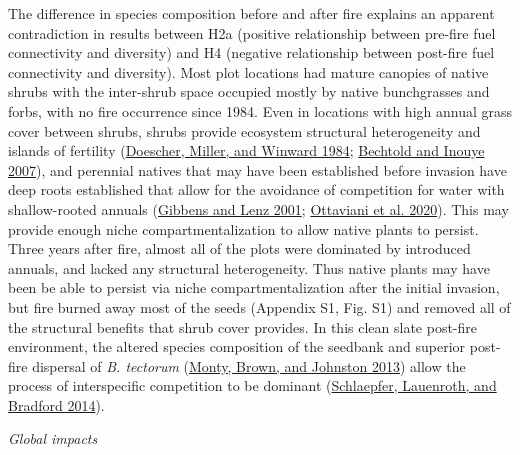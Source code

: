 \documentclass[
  12pt,
]{article}
\begin{document}
The difference in species composition before and after fire explains an
apparent contradiction in results between H2a (positive relationship
between pre-fire fuel connectivity and diversity) and H4 (negative
relationship between post-fire fuel connectivity and diversity). Most
plot locations had mature canopies of native shrubs with the inter-shrub
space occupied mostly by native bunchgrasses and forbs, with no fire
occurrence since 1984. Even in locations with high annual grass cover
between shrubs, shrubs provide ecosystem structural heterogeneity and
islands of fertility (\protect\hyperlink{ref-Doescher1984}{Doescher,
Miller, and Winward 1984}; \protect\hyperlink{ref-Bechtold2007}{Bechtold
and Inouye 2007}), and perennial natives that may have been established
before invasion have deep roots established that allow for the avoidance
of competition for water with shallow-rooted annuals
(\protect\hyperlink{ref-Gibbens2001}{Gibbens and Lenz 2001};
\protect\hyperlink{ref-Ottaviani2020}{Ottaviani et al. 2020}). This may
provide enough niche compartmentalization to allow native plants to
persist. Three years after fire, almost all of the plots were dominated
by introduced annuals, and lacked any structural heterogeneity. Thus
native plants may have been be able to persist via niche
compartmentalization after the initial invasion, but fire burned away
most of the seeds (Appendix S1, Fig. S1) and removed all of the
structural benefits that shrub cover provides. In this clean slate
post-fire environment, the altered species composition of the seedbank
and superior post-fire dispersal of \emph{B. tectorum}
(\protect\hyperlink{ref-Monty2013}{Monty, Brown, and Johnston 2013})
allow the process of interspecific competition to be dominant
(\protect\hyperlink{ref-Schlaepfer2014}{Schlaepfer, Lauenroth, and
Bradford 2014}).

\emph{Global impacts}
\end{document}
